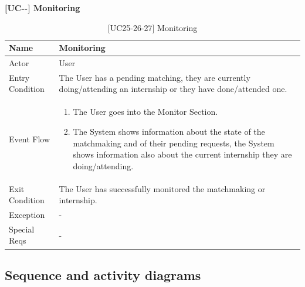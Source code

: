 \textbf{[UC\nextUseCases-\nextUseCases-\nextUseCases] Monitoring}
\begin{table}[H] %
    \centering
    \begin{tabular}{|p{3cm}|p{10cm}|}
    \hline
    Name & Monitoring\\ \hline
    Actor  &  User  \\ \hline
    Entry Condition  & The User has a pending matching, they are currently doing/attending an internship or they have done/attended one. \\ \hline
    Event Flow  & 
    \begin{enumerate}[noitemsep, topsep=0pt]
        \item The User goes into the Monitor Section.
        \item The System shows information about the state of the matchmaking and of their pending requests, the System shows information also about the current internship they are doing/attending.
    \end{enumerate}
    \\ \hline
    Exit Condition  & The User has successfully monitored the matchmaking or internship. \\ \hline
    Exception  &  - \\ \hline
    Special Reqs  &  - \\ \hline
    \end{tabular}
    \caption{[UC25-26-27] Monitoring}
\end{table}

\subsection{Sequence and activity diagrams}

\newcommand{\nextUCDiagr}{\stepcounter{useCasesDiagrCounter}\arabic{useCasesDiagrCounter}}

